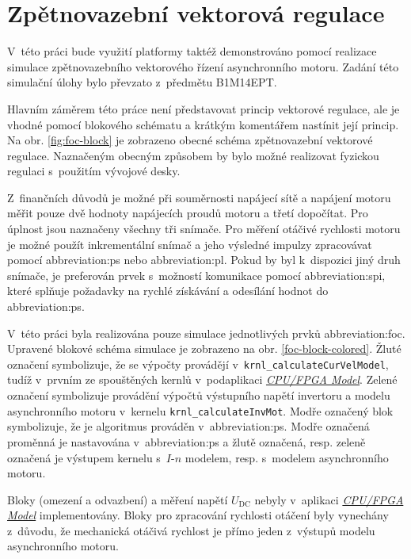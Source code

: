 \documentclass[a4paper, twoside, 11pt]{article}
\begin{document}
\section{Zpětnovazební vektorová regulace}
	V~této práci bude využití platformy taktéž demonstrováno pomocí realizace simulace zpětnovazebního vektorového řízení asynchronního motoru. Zadání této simulační úlohy bylo převzato z~předmětu B1M14EPT. \cite{lipcak-bauer-ept-moodle}\par
	Hlavním záměrem této práce není představovat princip vektorové regulace, ale je vhodné pomocí blokového schématu a krátkým komentářem nastínit její princip. Na obr. \ref{fig:foc-block} je zobrazeno obecné schéma zpětnovazební vektorové regulace. Naznačeným obecným způsobem by bylo možné realizovat fyzickou regulaci s~použitím vývojové desky.\par
	Z~finančních důvodů je možné při souměrnosti napájecí sítě a napájení motoru měřit pouze dvě hodnoty napájecích proudů motoru a třetí dopočítat. Pro úplnost jsou naznačeny všechny tři snímače. Pro měření otáčivé rychlosti motoru je možné použít inkrementální snímač a jeho výsledné impulzy zpracovávat pomocí \gls{abbreviation:ps} nebo \gls{abbreviation:pl}. Pokud by byl k~dispozici jiný druh snímače, je preferován prvek s~možností komunikace pomocí \gls{abbreviation:spi}, které splňuje požadavky na rychlé získávání a odesílání hodnot do \gls{abbreviation:ps}.\par
	V~této práci byla realizována pouze simulace jednotlivých prvků \gls{abbreviation:foc}. Upravené blokové schéma simulace je zobrazeno na obr. \ref{foc-block-colored}. \textcolor{ctuyellow}{Žluté označení} symbolizuje, že se výpočty provádějí v~\texttt{krnl\_calculateCurVelModel}, tudíž v~prvním ze spouštěných kernlů v~podaplikaci \hyperref[subsec:cpu-fpga-model]{\textit{CPU/FPGA Model}}. \textcolor{ctugreen}{Zelené označení} symbolizuje provádění výpočtů výstupního napětí invertoru a modelu asynchronního motoru v~kernelu \texttt{krnl\_calculateInvMot}. \textcolor{ctublue}{Modře označený} blok symbolizuje, že je algoritmus prováděn v~\gls{abbreviation:ps}. \textcolor{ctublue}{Modře označená} proměnná je nastavována v~\gls{abbreviation:ps} a \textcolor{ctuyellow}{žlutě označená}, resp. \textcolor{ctugreen}{zeleně označená} je výstupem kernelu s~$I$-$n$ modelem, resp. s~modelem asynchronního motoru.\par
	Bloky (omezení a odvazbení) a měření napětí $U_\text{DC}$ nebyly v~aplikaci \hyperref[subsec:cpu-fpga]{\textit{CPU/FPGA Model}} implementovány. Bloky pro zpracování rychlosti otáčení byly vynechány z~důvodu, že mechanická otáčivá rychlost je přímo jeden z~výstupů modelu asynchronního motoru.
\end{document}
